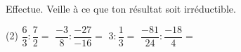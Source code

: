 %
%
Effectue. Veille à ce que ton résultat soit irréductible.
  \begin{tasks}(2)
    \task $\dfrac{6}{3} : \dfrac{7}{2}=$
    \task $\dfrac{-3}{8} : \dfrac{-27}{-16}=$
    \task $3 : \dfrac{1}{3}=$
    \task $\dfrac{-81}{24} : \dfrac{-18}{4}=$
  \end{tasks}

